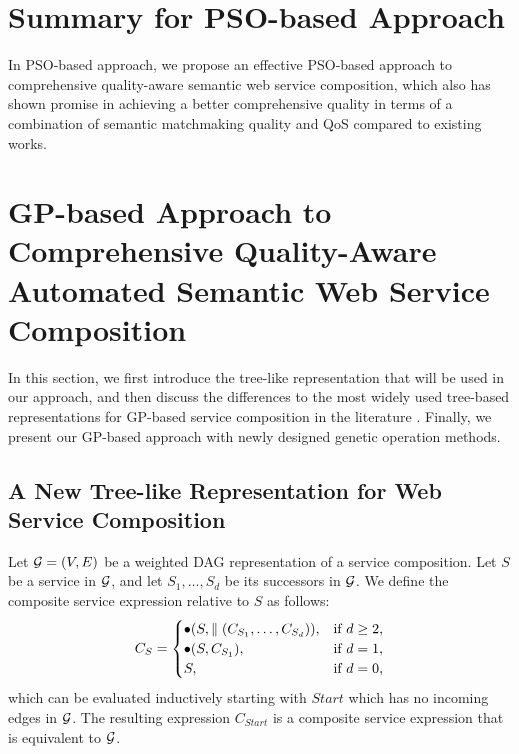 \section{Summary for PSO-based Approach}\label{summary1}

In PSO-based approach, we propose an effective PSO-based approach to comprehensive quality-aware semantic web service composition, which also has shown promise in achieving a better comprehensive quality in terms of a combination of semantic matchmaking quality and QoS compared to existing works.
\section{GP-based Approach to Comprehensive Quality-Aware Automated Semantic Web Service Composition}\label{GPApproach}

In this section, we first introduce the tree-like representation that will be used in our approach, and then discuss the differences to the most widely used tree-based representations for GP-based service composition in the literature \cite{gupta2015optimization,da2016genetic,yu2013adaptive}. Finally, we present our GP-based approach with newly designed genetic operation methods.
\subsection{A New Tree-like Representation for Web Service Composition}\label{representation} 

Let $\mathcal{G}=(V,E)$ be a weighted DAG representation of a service composition. Let $S$ be a service in $\mathcal{G}$, and let $S_1,\ldots,S_d$ be its successors in $\mathcal{G}$. We define the composite service expression relative to $S$ as follows: 
\begin{equation}
\label{eq_s_expression}
    C_S=
    \begin{cases}
      \bullet(S,\parallel(C_{S_1},\ldots,C_{S_d})), & \text{if $d\ge 2$}, \\
      \bullet(S,C_{S_1}), & \text{if $d=1$}, \\
      S, & \text{if $d=0$},
    \end{cases}
\end{equation}
which can be evaluated inductively starting with $Start$ which has no incoming edges in $\mathcal{G}$. The resulting expression $C_{Start}$ is a composite service expression that is equivalent to $\mathcal{G}$.

